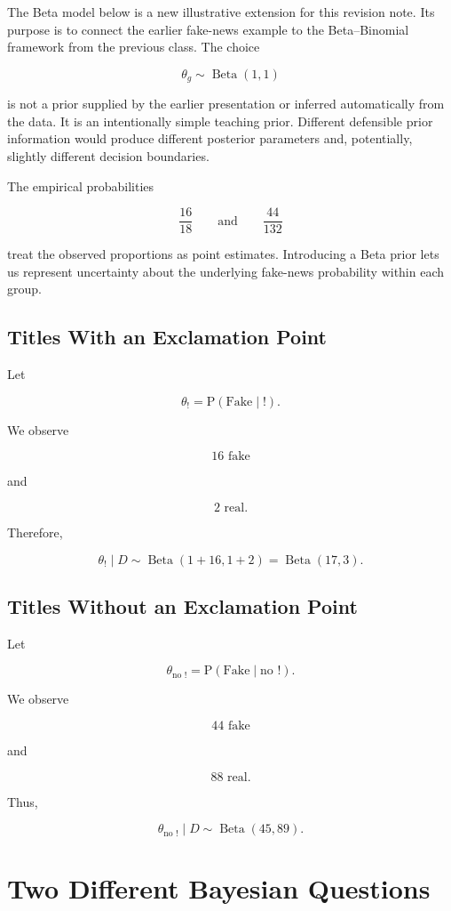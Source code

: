 \documentclass[11pt]{article}
\newcommand{\Prob}{\mathrm{P}}
\begin{document}
The Beta model below is a new illustrative extension for this revision note. Its purpose is to connect the earlier fake-news example to the Beta--Binomial framework from the previous class. The choice

\[
\theta_g\sim\operatorname{Beta}(1,1)
\]

is not a prior supplied by the earlier presentation or inferred automatically from the data. It is an intentionally simple teaching prior. Different defensible prior information would produce different posterior parameters and, potentially, slightly different decision boundaries.

The empirical probabilities

\[
\frac{16}{18}
\qquad\text{and}\qquad
\frac{44}{132}
\]

treat the observed proportions as point estimates. Introducing a Beta prior lets us represent uncertainty about the underlying fake-news probability within each group.

\subsection{Titles With an Exclamation Point}

Let

\[
\theta_{!}
=
\Prob(\text{Fake}\mid !).
\]

We observe

\[
16\text{ fake}
\]

and

\[
2\text{ real}.
\]

Therefore,

\[
\theta_{!}\mid D
\sim
\operatorname{Beta}(1+16,1+2)
=
\operatorname{Beta}(17,3).
\]

\subsection{Titles Without an Exclamation Point}

Let

\[
\theta_{\text{no }!}
=
\Prob(\text{Fake}\mid\text{no }!).
\]

We observe

\[
44\text{ fake}
\]

and

\[
88\text{ real}.
\]

Thus,

\[
\theta_{\text{no }!}\mid D
\sim
\operatorname{Beta}(45,89).
\]

\section{Two Different Bayesian Questions}
\end{document}
